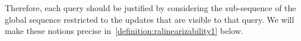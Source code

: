Therefore, each query should be justified by considering the
sub-sequence of the global sequence restricted to the updates that are
visible to that query.
We will make these notions precise in~\autoref{definition:ralinearizability1} below.



%


